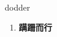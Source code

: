 
\begin{frame}
{\huge dodder}
\begin{center}
\begin{enumerate}\Large
  \item \textbf{蹒跚而行}
\end{enumerate}
\end{center}
\end{frame}
